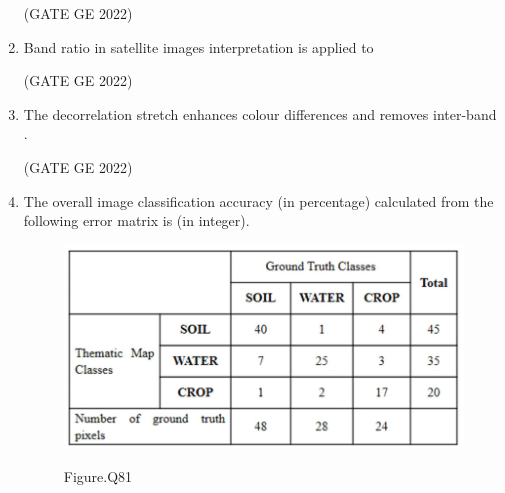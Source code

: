 \documentclass[journal,12pt,onecolumn]{IEEEtran}
\theoremstyle{remark}
\begin{document}
\begin{enumerate}
\hfill (GATE GE 2022)

\begin{enumerate}
\end{enumerate}

\item Band ratio in satellite images interpretation is applied to

\hfill (GATE GE 2022)

\begin{enumerate}
\end{enumerate}

\item The decorrelation stretch enhances colour differences and removes inter-band \makebox[1cm]{\hrulefill}.

\hfill (GATE GE 2022)

\begin{enumerate}
\end{enumerate}

\item The overall image classification accuracy (in percentage) calculated from the following error matrix is \makebox[1cm]{\hrulefill} (in integer).
\begin{figure}[H]
    \centering
    \includegraphics[width=0.8\columnwidth]{figs/fig_81.png}
    \label{fig:question81}
    \caption*{Figure.Q81}
\end{figure}


\end{enumerate}
\end{document}
